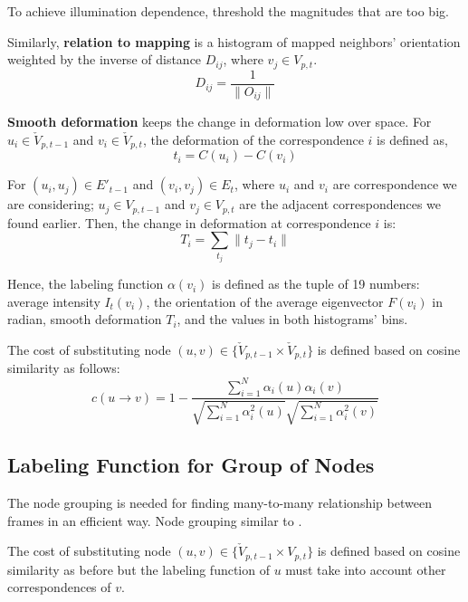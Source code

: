 \documentclass[10pt,letterpaper]{article}
\begin{document}
To achieve illumination dependence, threshold the magnitudes that are too big.

Similarly, \textbf{relation to mapping} is a histogram of mapped neighbors' orientation weighted by the inverse of distance $D_{ij}$, where $v_j \in V_{p,t}$.
\begin{equation}
D_{ij} = \frac{1}{ \| O_{ij} \| }
\end{equation}

\textbf{Smooth deformation} keeps the change in deformation low over space. For $u_i \in \check{V}_{p,t-1}$ and $v_i \in \check{V}_{p,t}$, the deformation of the correspondence $i$ is defined as,
\begin{equation}
t_i = C(u_i) - C(v_i)
\end{equation}

For $(u_i, u_j) \in E'_{t-1}$ and $(v_i, v_j) \in E_t$, where $u_i$ and $v_i$ are correspondence we are considering; $u_j \in V_{p,t-1}$ and $v_j \in  V_{p,t}$ are the adjacent correspondences we found earlier. Then, the change in deformation at correspondence $i$ is:
\begin{equation}
T_i = \sum_{t_j} \| t_j - t_i \|
\end{equation}

Hence, the labeling function $\alpha(v_i)$ is defined as the tuple of 19 numbers: average intensity $I_t(v_i)$, the orientation of the average eigenvector $F(v_i)$ in radian, smooth deformation $T_i$, and the values in both histograms' bins.

The cost of substituting node $(u,v) \in \{ \check{V}_{p,t-1} \times \check{V}_{p,t} \}$ is defined based on cosine similarity as follows:
\begin{equation}
c(u \rightarrow v) = 1 - \frac{\sum_{i=1}^N \alpha_i(u)\alpha_i(v)}{\sqrt{\sum_{i=1}^N \alpha_i^2(u)}\sqrt{\sum_{i=1}^N \alpha_i^2(v)}}
\end{equation}

\subsection{Labeling Function for Group of Nodes}
The node grouping is needed for finding many-to-many relationship between frames in an efficient way. Node grouping similar to \cite{morrison2015}.

The cost of substituting node $(u,v) \in \{ \check{V}_{p,t-1} \times V_{p,t} \}$ is defined based on cosine similarity as before but the labeling function of $u$ must take into account other correspondences of $v$.
\end{document}
